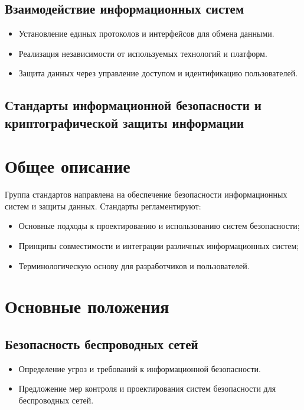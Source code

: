 \subsection*{Взаимодействие информационных систем}
\begin{itemize}
    \item Установление единых протоколов и интерфейсов для обмена данными.
    \item Реализация независимости от используемых технологий и платформ.
    \item Защита данных через управление доступом и идентификацию пользователей.
\end{itemize}

\subsection{Стандарты информационной безопасности и криптографической защиты информации}

\section*{Общее описание}
Группа стандартов направлена на обеспечение безопасности информационных систем и защиты данных. Стандарты регламентируют:
\begin{itemize}
    \item Основные подходы к проектированию и использованию систем безопасности;
    \item Принципы совместимости и интеграции различных информационных систем;
    \item Терминологическую основу для разработчиков и пользователей.
\end{itemize}

\section*{Основные положения}
\subsection*{Безопасность беспроводных сетей}
\begin{itemize}
    \item Определение угроз и требований к информационной безопасности.
    \item Предложение мер контроля и проектирования систем безопасности для беспроводных сетей.
\end{itemize}

